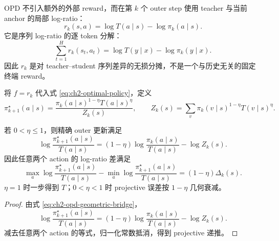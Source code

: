 OPD 不引入额外的外部 reward，而在第 $k$ 个 outer step 使用 teacher 与当前 anchor 的局部 log-ratio：
\begin{equation}
\label{eq:ch2-opd-current-reward}
r_k(s,a)=\log T(a\mid s)-\log\pi_k(a\mid s).
\end{equation}
它是序列 log-ratio 的逐 token 分解：
\begin{equation}
\label{eq:ch2-opd-sequence-telescope}
\sum_{t=1}^{H}r_k(s_t,a_t)
=\log T(y\mid x)-\log\pi_k(y\mid x).
\end{equation}
因此 $r_k$ 是对 teacher--student 序列差异的无损分摊，不是一个与历史无关的固定终端 reward。

\begin{definition}
\label{def:ch2-opd-target}
将 $f=r_k$ 代入式 \eqref{eq:ch2-optimal-policy}，定义
\begin{equation}
\label{eq:ch2-opd-geometric-bridge}
\pi_{k+1}^{\star}(a\mid s)
=\frac{\pi_k(a\mid s)^{1-\eta}T(a\mid s)^\eta}{Z_k(s)},
\qquad
Z_k(s)=\sum_v\pi_k(v\mid s)^{1-\eta}T(v\mid s)^\eta.
\end{equation}
\end{definition}

\begin{theorem}
\label{thm:ch2-opd-geometric-bridge}
若 $0<\eta\leq1$，则精确 outer 更新满足
\begin{equation}
\label{eq:ch2-opd-projective-contraction}
\log\frac{\pi_{k+1}^{\star}(a\mid s)}{T(a\mid s)}
=(1-\eta)\log\frac{\pi_k(a\mid s)}{T(a\mid s)}-\log Z_k(s).
\end{equation}
因此任意两个 action 的 log-ratio 差满足
\[
\max_a\log\frac{\pi_{k+1}^{\star}(a\mid s)}{T(a\mid s)}
-\min_a\log\frac{\pi_{k+1}^{\star}(a\mid s)}{T(a\mid s)}
=(1-\eta)\Delta_k(s).
\]
$\eta=1$ 时一步得到 $T$；$0<\eta<1$ 时 projective 误差按 $1-\eta$ 几何衰减。
\end{theorem}

\begin{proof}
由式 \eqref{eq:ch2-opd-geometric-bridge}，
\[
\log\frac{\pi_{k+1}^{\star}(a\mid s)}{T(a\mid s)}
=(1-\eta)\log\frac{\pi_k(a\mid s)}{T(a\mid s)}-\log Z_k(s).
\]
减去任意两个 action 的等式，归一化常数抵消，得到 projective 递推。
\end{proof}





